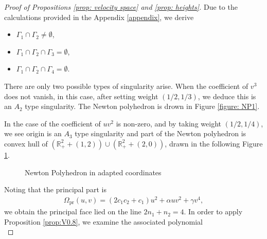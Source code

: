 \documentclass[12pt]{amsart}
\newcommand{\R}{\mathbb{R}}
\begin{document}
\begin{proof}[Proof of Propositions \ref{prop: velocity space} and \ref{prop: heights}]
Due to the calculations provided in the Appendix \ref{appendix}, we derive
\begin{itemize}\label{it:1}
    \item $\Gamma_{1}\cap\Gamma_{2}\neq \emptyset$,
    \item $\Gamma_{1}\cap\Gamma_{2}\cap\Gamma_{3}=\emptyset$,
    \item $\Gamma_{1}\cap\Gamma_{2}\cap\Gamma_{4}=\emptyset$.
\end{itemize}
There are only two possible types of singularity arise. When the coefficient of $v^3$ does not vanish, in this case, after setting weight $\left(1/2,1/3\right)$, we deduce this is an $A_{2}$ type singularity. The Newton polyhedron is drown in Figure \ref{figure: NP1}. 

In the case of the coefficient of $uv^2$ is non-zero, and by taking weight $\left(1/2,1/4\right)$, we see origin is an $A_{3}$ type singularity and part of the Newton polyhedron is convex hull of $\left(\R^{2}_{+}+\left(1,2\right)\right)\cup\left(\R^{2}_{+}+\left(2,0\right)\right)$, drawn in the following Figure \ref{figure: NP2bA4}.
\begin{figure}[H]
	\centering
		\caption{Newton Polyhedron in adapted coordinates}\label{figure: NP2bA4}
  \end{figure}
\noindent Noting that the principal part is
\begin{equation*}
    \begin{aligned}
        \Omega_{\mathrm{pr}}\left(u,v\right)=\left(2c_1c_2+c_1\right)u^2+\alpha uv^2+\gamma v^4,
    \end{aligned}
\end{equation*} we obtain the principal face lied on the line $2n_1+n_2=4$. In order to apply Proposition \ref{prop:V0.8}, we examine the associated polynomial
\begin{equation*}

\end{equation*}
\end{proof}
\end{document}

